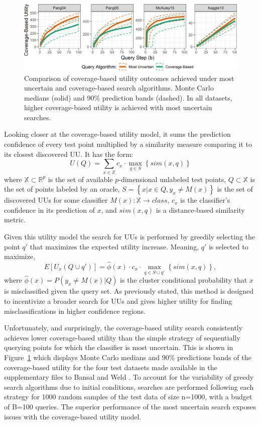 \documentclass[10pt, conference]{IEEEtran}
\begin{document}
\begin{figure}[h!]
  \centering
  \includegraphics[width=\textwidth]{CoverageVsMostUncertainNarrow.png}
  \caption{Comparison of coverage-based utility outcomes achieved under most uncertain and coverage-based search algorithms. Monte Carlo medians (solid) and 90\% prediction bands (dashed).  In all datasets, higher coverage-based utility is achieved with most uncertain searches.}
  \label{fig:coverutil}
\end{figure}

Looking closer at the coverage-based utility model, it sums the prediction confidence of every test point multiplied by a similarity measure comparing it to its closest discovered UU.  It has the form: $$U(Q) = \sum_{x \in \mathbb{X}} c_x \cdot \max_{q \in S} \left\{sim\left(x,q \right) \right\}$$ where $\mathbb{X} \subset \mathbb{R}^p$ is the set of available $p$-dimensional unlabeled test points, $Q \subset \mathbb{X}$ is the set of points labeled by an oracle, $S = \left\{x|x \in Q, y_x \neq M(x)\right\}$ is the set of discovered UUs for some classifier $M(x):\mathbb{X} \rightarrow class$, $c_x$ is the classifier's confidence in its prediction of $x$, and $sim(x,q)$ is a distance-based similarity metric. 

Given this utility model the search for UUs is performed by greedily selecting the point $q'$ that maximizes the expected utility increase.  Meaning, $q'$ is selected to maximize, $$E\left[U_x\left(Q \cup q'\right)\right] = \hat{\phi}(x) \cdot c_x \cdot \max_{q \in S \cup q'} \left\{sim\left(x,q \right) \right\},$$ where $\hat{\phi}(x) = P\left(y_x \neq M(x) |Q \right)$ is the cluster conditional probability that $x$ is misclassified given the query set.  As previously stated, this method is designed to incentivize a broader search for UUs and gives higher utility for finding misclassifications in higher confidence regions.  

Unfortunately, and surprisingly, the coverage-based utility search consistently achieves lower coverage-based utility than the simple strategy of sequentially querying points for which the classifier is most uncertain.  This is shown in Figure~\ref{fig:coverutil} which displays Monte Carlo medians and 90\% predictions bands of the coverage-based utility for the four test datasets made available in the supplementary files to Bansal and Weld \cite{Bansal2018}.  To account for the variability of greedy search algorithms due to initial conditions, searches are performed following each strategy for 1000 random samples of the test data of size n=1000, with a budget of B=100 queries. The superior performance of the most uncertain search exposes issues with the coverage-based utility model.  
\end{document}

